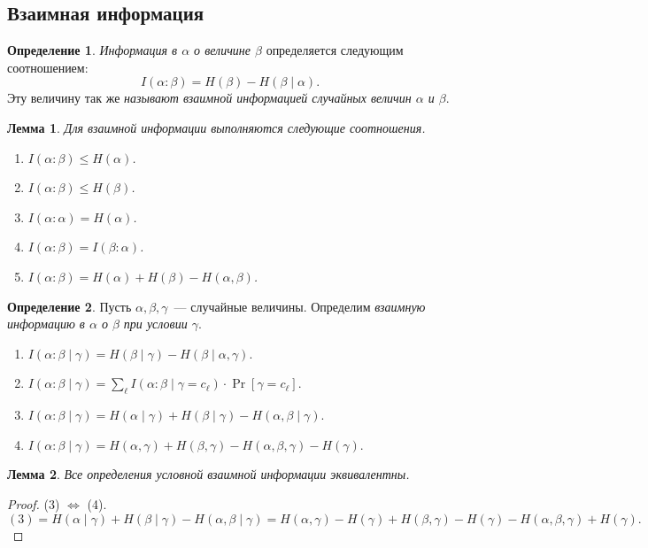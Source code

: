 \documentclass[12pt]{article}
\theoremstyle{definition}
\newtheorem{definition}{Определение}[section]
\theoremstyle{plain}
\newtheorem{lemma}{Лемма}[section]
\theoremstyle{remark}
\begin{document}
\subsection{Взаимная информация}
\begin{definition}
\emph{Информация в \(\alpha\) о величине \(\beta\)} определяется следующим соотношением:
\[
    I(\alpha:\beta) = H(\beta) - H(\beta\mid\alpha).
\]
Эту величину так же \emph{называют взаимной информацией случайных величин \(\alpha\) и \(\beta\)}.
\end{definition}
\begin{lemma}
Для взаимной информации выполняются следующие соотношения.
\begin{enumerate}
\item \(I(\alpha:\beta) \le H(\alpha) \).
\item \(I(\alpha:\beta) \le H(\beta) \).
\item \(I(\alpha:\alpha) = H(\alpha) \).
\item \(I(\alpha:\beta) = I(\beta:\alpha) \).
\item \(I(\alpha:\beta) = H(\alpha) + H(\beta) - H(\alpha,\beta) \).
\end{enumerate}
\end{lemma}
\begin{definition}
    Пусть \(\alpha,\beta,\gamma\)~--- случайные величины. Определим
    \emph{взаимную информацию в \(\alpha\) о \(\beta\) при условии \(\gamma\)}.
    \begin{enumerate}
        \item \(I(\alpha:\beta\mid\gamma) = H(\beta\mid\gamma) -
            H(\beta\mid\alpha,\gamma)\).
        \item \(I(\alpha:\beta\mid\gamma) = \sum_\ell I(\alpha:\beta \mid
            \gamma=c_\ell)\cdot \Pr[\gamma = c_\ell]\).
        \item \(I(\alpha:\beta\mid\gamma) = H(\alpha\mid\gamma) + H(\beta\mid\gamma) -
            H(\alpha,\beta\mid\gamma)\).
        \item \(I(\alpha:\beta\mid\gamma) = H(\alpha,\gamma) + H(\beta,\gamma) -
            H(\alpha,\beta,\gamma) - H(\gamma)\).
    \end{enumerate}
\end{definition}
\begin{lemma} 
    Все определения условной взаимной информации эквивалентны.
\end{lemma}
\begin{proof}
    (3) \(\iff\) (4).
    \[
    (3) = H(\alpha\mid\gamma) + H(\beta\mid\gamma) - H(\alpha,\beta\mid\gamma) =
    H(\alpha,\gamma) - H(\gamma) + H(\beta,\gamma) - H(\gamma) -
    H(\alpha,\beta,\gamma) + H(\gamma).
    \]

\end{proof}
\end{document}
